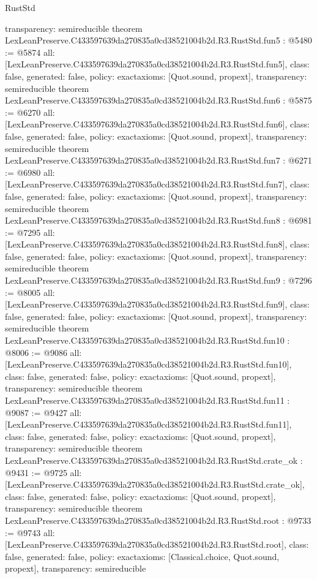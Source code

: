 \begin{lexlean}{RustStd}
\begin{coremodule}
{  transparency: semireducible
}
theorem LexLeanPreserve.C433597639da270835a0cd38521004b2d.R3.RustStd.fun5 : @5480 := @5874 {
  all: [LexLeanPreserve.C433597639da270835a0cd38521004b2d.R3.RustStd.fun5],
  class: false,
  generated: false,
  policy: exact{axioms: [Quot.sound, propext]},
  transparency: semireducible
}
theorem LexLeanPreserve.C433597639da270835a0cd38521004b2d.R3.RustStd.fun6 : @5875 := @6270 {
  all: [LexLeanPreserve.C433597639da270835a0cd38521004b2d.R3.RustStd.fun6],
  class: false,
  generated: false,
  policy: exact{axioms: [Quot.sound, propext]},
  transparency: semireducible
}
theorem LexLeanPreserve.C433597639da270835a0cd38521004b2d.R3.RustStd.fun7 : @6271 := @6980 {
  all: [LexLeanPreserve.C433597639da270835a0cd38521004b2d.R3.RustStd.fun7],
  class: false,
  generated: false,
  policy: exact{axioms: [Quot.sound, propext]},
  transparency: semireducible
}
theorem LexLeanPreserve.C433597639da270835a0cd38521004b2d.R3.RustStd.fun8 : @6981 := @7295 {
  all: [LexLeanPreserve.C433597639da270835a0cd38521004b2d.R3.RustStd.fun8],
  class: false,
  generated: false,
  policy: exact{axioms: [Quot.sound, propext]},
  transparency: semireducible
}
theorem LexLeanPreserve.C433597639da270835a0cd38521004b2d.R3.RustStd.fun9 : @7296 := @8005 {
  all: [LexLeanPreserve.C433597639da270835a0cd38521004b2d.R3.RustStd.fun9],
  class: false,
  generated: false,
  policy: exact{axioms: [Quot.sound, propext]},
  transparency: semireducible
}
theorem LexLeanPreserve.C433597639da270835a0cd38521004b2d.R3.RustStd.fun10 : @8006 := @9086 {
  all: [LexLeanPreserve.C433597639da270835a0cd38521004b2d.R3.RustStd.fun10],
  class: false,
  generated: false,
  policy: exact{axioms: [Quot.sound, propext]},
  transparency: semireducible
}
theorem LexLeanPreserve.C433597639da270835a0cd38521004b2d.R3.RustStd.fun11 : @9087 := @9427 {
  all: [LexLeanPreserve.C433597639da270835a0cd38521004b2d.R3.RustStd.fun11],
  class: false,
  generated: false,
  policy: exact{axioms: [Quot.sound, propext]},
  transparency: semireducible
}
theorem LexLeanPreserve.C433597639da270835a0cd38521004b2d.R3.RustStd.crate_ok : @9431 := @9725 {
  all: [LexLeanPreserve.C433597639da270835a0cd38521004b2d.R3.RustStd.crate_ok],
  class: false,
  generated: false,
  policy: exact{axioms: [Quot.sound, propext]},
  transparency: semireducible
}
theorem LexLeanPreserve.C433597639da270835a0cd38521004b2d.R3.RustStd.root : @9733 := @9743 {
  all: [LexLeanPreserve.C433597639da270835a0cd38521004b2d.R3.RustStd.root],
  class: false,
  generated: false,
  policy: exact{axioms: [Classical.choice, Quot.sound, propext]},
  transparency: semireducible
}


\end{coremodule}
\end{lexlean}
